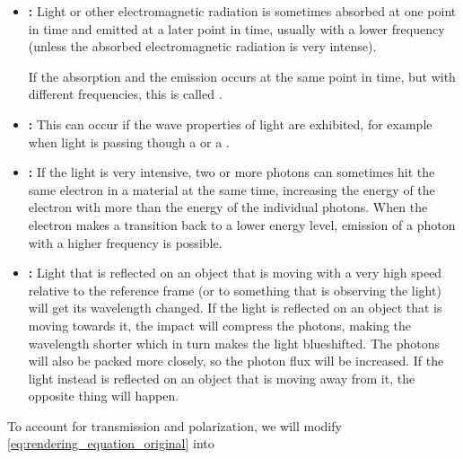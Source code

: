 \begin{itemize}
\item \textbf{:} Light or other electromagnetic radiation is sometimes absorbed at one point in time and emitted at a later point in time, usually with a lower frequency (unless the absorbed electromagnetic radiation is very intense).

If the absorption and the emission occurs at the same point in time, but with different frequencies, this is called .
    
\item \textbf{:} This can occur if the wave properties of light are exhibited, for example when light is passing though a  or a .
    
\item \textbf{:} If the light is very intensive, two or more photons can sometimes hit the same electron in a material at the same time, increasing the energy of the electron with more than the energy of the individual photons. When the electron makes a transition back to a lower energy level, emission of a photon with a higher frequency is possible.
    
\item \textbf{:} Light that is reflected on an object that is moving with a very high speed relative to the reference frame (or to something that is observing the light) will get its wavelength changed. If the light is reflected on an object that is moving towards it, the impact will compress the photons, making the wavelength shorter which in turn makes the light blueshifted. The photons will also be packed more closely, so the photon flux will be increased. If the light instead is reflected on an object that is moving away from it, the opposite thing will happen.
\end{itemize}

To account for transmission and polarization, we will modify \eqref{eq:rendering_equation_original} into

